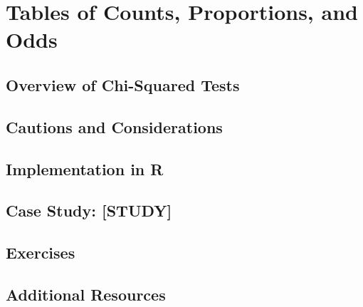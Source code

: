
\chapter{Tables of Counts, Proportions, and Odds}

\section{Overview of Chi-Squared Tests}

\section{Cautions and Considerations}

\section{Implementation in R}

\section{Case Study: [STUDY]}

\section{Exercises}

\section{Additional Resources}
